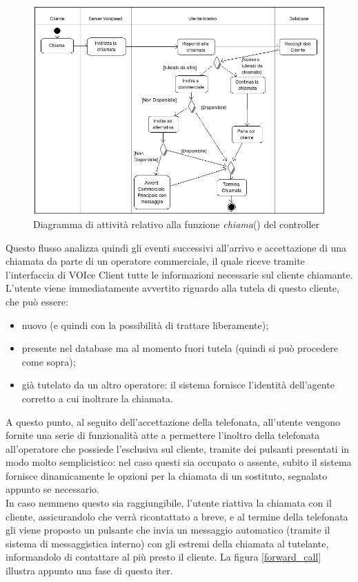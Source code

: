 \begin{figure}[!ht]
\centering
  \includegraphics[scale=0.7]{./images/chiamataAct.png}
\caption{Diagramma di attivit\`a relativo alla funzione \textit{chiama}() del controller}
\label{act_call}
\end{figure}

\noindent
Questo flusso analizza quindi gli eventi successivi all'arrivo e accettazione di una chiamata da parte di un operatore commerciale, il quale riceve tramite l'interfaccia di VOIce Client tutte le informazioni necessarie sul cliente chiamante. L'utente viene immediatamente avvertito riguardo alla tutela di questo cliente, che pu\`o essere:
\begin{itemize}
 \item nuovo (e quindi con la possibilit\`a di trattare liberamente);
 \item presente nel database ma al momento fuori tutela (quindi si pu\`o procedere come sopra);
 \item gi\`a tutelato da un altro operatore: il sistema fornisce l'identit\`a dell'agente corretto a cui inoltrare la chiamata.
\end{itemize}
\noindent
A questo punto, al seguito dell'accettazione della telefonata, all'utente vengono fornite una serie di funzionalit\`a atte a permettere l'inoltro della telefonata all'operatore che possiede l'esclusiva sul cliente, tramite dei pulsanti presentati in modo molto semplicistico: nel caso questi sia occupato o assente, subito il sistema fornisce dinamicamente le opzioni per la chiamata di un sostituto, segnalato appunto se necessario. \\
In caso nemmeno questo sia raggiungibile, l'utente riattiva la chiamata con il cliente, assicurandolo che verr\`a ricontattato a breve, e al termine della telefonata gli viene proposto un pulsante che invia un messaggio automatico (tramite il sistema di messaggistica interno) con gli estremi della chiamata al tutelante, informandolo di contattare al pi\`u presto il cliente. La figura \ref{forward_call} illustra appunto una fase di questo iter. 

